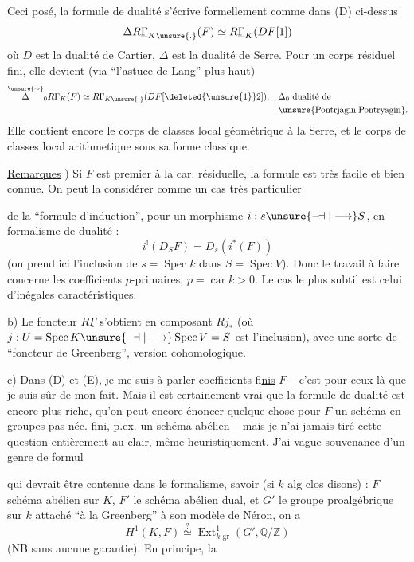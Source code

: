 Ceci posé, la formule de dualité s'écrive formellement comme dans (D) ci-dessus
\[
 \Delta R\underline{\Gamma}_{K\unsure{.}}(F)\simeq R\underline{\Gamma}_K(DF[1])
\]
où $D$ est la dualité de Cartier, $\Delta$ est la dualité de Serre. Pour un corps résiduel fini, elle devient (via ``l'astuce de Lang'' plus haut)
\[
 \begin{aligned}
 \overset{\unsure{\sim}}{\Delta}_0 R\Gamma_K(F)\simeq R\Gamma_{K\unsure{.}}(DF[\deleted{\unsure{1}}2]),&\quad \Delta_0\ \text{dualité de}\\
 &\quad\text{\unsure{Pontrjagin|Pontryagin}.}
 \end{aligned}
\]
Elle contient encore le corps de classes local géométrique à la Serre, et le corps de classes local arithmetique sous sa forme classique.

\uline{Remarques} ) Si $F$ est premier à la car. résiduelle, la formule est très facile et bien connue. On peut la considérer comme un cas très particulier

de la ``formule d'induction'', pour un morphisme $i:s\unsure{\relbar\joinrel\dashv|\longrightarrow}S$, en formalisme de dualité :
\[
 i^!(D_SF)=D_s(i^*(F))
\]
(on prend ici l'inclusion de $s=\operatorname{Spec}k$ dans $S=\operatorname{Spec}V$). Donc le travail à faire concerne les coefficients $p$-primaires, $p=\operatorname{car}k>0$. Le cas le plus subtil est celui d'inégales caractéristiques.

b) Le foncteur $R\underline{\Gamma}$ s'obtient en composant $Rj_*$ (où $j:U=\operatorname{Spec}K\unsure{\relbar\joinrel\dashv|\longrightarrow}\operatorname{Spec}V=S$ est l'inclusion), avec une sorte de ``foncteur de Greenberg'', version cohomologique.

c) Dans (D) et (E), je me suis  à parler  coefficients fi\uline{nis} $F$ -- c'est pour ceux-là que je suis sûr de mon fait. Mais il est certainement vrai que la formule de dualité est encore plus riche, qu'on peut encore énoncer quelque chose  pour  $F$ un schéma en groupes pas néc. fini, p.ex. un schéma abélien  -- mais je n'ai jamais tiré cette question entièrement au clair, même heuristiquement. J'ai  vague souvenance d'un genre de formul

qui devrait être contenue dans le formalisme, savoir (si $k$ alg clos disons) :  $F$ schéma abélien sur $K$, $F'$ le schéma abélien dual, et $G'$ le groupe proalgébrique sur $k$ attaché ``à la Greenberg'' à son modèle de Néron, on a
\[
 H^1(K,F)\overset{?}{\simeq}\operatorname{Ext}^{1}_{k\text{-}\mathrm{gr}}(G',\mathbb Q/\mathbb Z)
\]
(NB sans aucune garantie). En principe, la
{\reversemarginpar{}}

